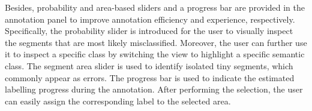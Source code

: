 Besides, probability and area-based sliders and a progress bar are provided in the annotation panel to improve annotation efficiency and experience, respectively. 
Specifically, the probability slider is introduced for the user to visually inspect the segments that are most likely misclassified.
Moreover, the user can further use it to inspect a specific class by switching the view to highlight a specific semantic class.
The segment area slider is used to identify isolated tiny segments, which commonly appear as errors.
The progress bar is used to indicate the estimated labelling progress during the annotation.
After performing the selection, the user can easily assign the corresponding label to the selected area.
